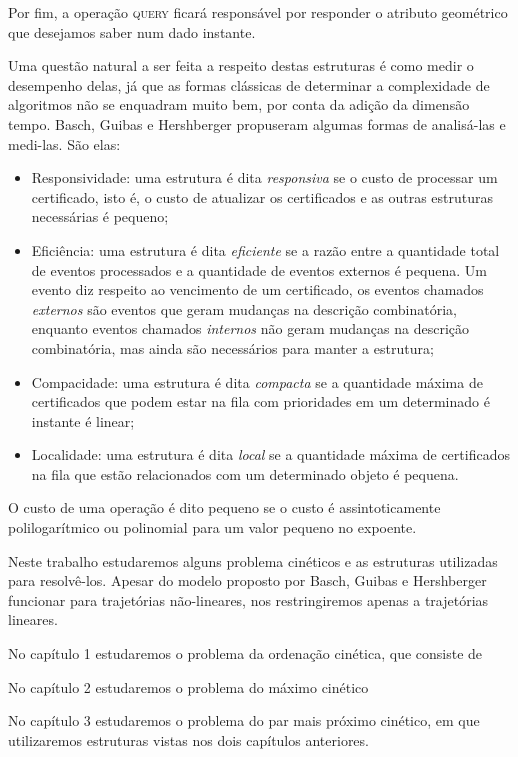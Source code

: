 Por fim, a operação \textsc{query} ficará responsável por responder o atributo
geométrico que desejamos saber num dado instante.

Uma questão natural a ser feita a respeito destas estruturas é como medir o
desempenho delas, já que as formas clássicas de determinar a complexidade de
algoritmos não se enquadram muito bem, por conta da adição da dimensão tempo. %
Basch, Guibas e Hershberger propuseram algumas formas de analisá-las e medi-las.
São elas:
\begin{itemize}
    \item Responsividade: uma estrutura é dita \textit{responsiva} se o custo de
    processar um certificado, isto é, o custo de atualizar os certificados e as
    outras estruturas necessárias é pequeno;
    \item Eficiência: uma estrutura é dita \textit{eficiente} se a razão entre a
    quantidade total de eventos processados e a quantidade de eventos externos é
    pequena. Um evento diz respeito ao vencimento de um certificado, os eventos
    chamados \textit{externos} são eventos que geram mudanças na descrição
    combinatória, enquanto eventos chamados \textit{internos} não geram mudanças
    na descrição combinatória, mas ainda são necessários para manter a
    estrutura;
    \item Compacidade: uma estrutura é dita \textit{compacta} se a quantidade máxima de
    certificados que podem estar na fila com prioridades em um determinado é
    instante é linear;
    \item Localidade: uma estrutura é dita \textit{local} se a quantidade máxima
    de certificados na fila que estão relacionados com um determinado objeto é
    pequena.
\end{itemize}

O custo de uma operação é dito pequeno se o custo é assintoticamente
polilogarítmico ou polinomial para um valor pequeno no expoente.

Neste trabalho estudaremos alguns problema cinéticos e as estruturas utilizadas
para resolvê-los. Apesar do modelo proposto por Basch, Guibas e Hershberger
funcionar para trajetórias não-lineares, nos restringiremos apenas a trajetórias
lineares.

No capítulo 1 estudaremos o problema da ordenação cinética, que consiste de 

No capítulo 2 estudaremos o problema do máximo cinético

No capítulo 3 estudaremos o problema do par mais próximo cinético, em que
utilizaremos estruturas vistas nos dois capítulos anteriores.


